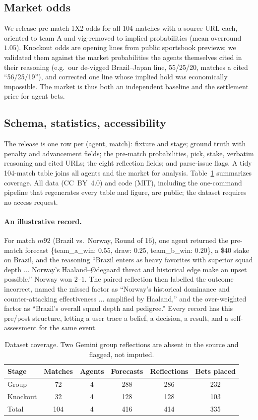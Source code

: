 \documentclass[sigconf,nonacm]{acmart}
\begin{document}
\subsection{Market odds}
\label{sec:odds}
We release pre-match 1X2 odds for all 104 matches with a source URL each,
oriented to team A and vig-removed to implied probabilities (mean overround
$1.05$). Knockout odds are opening lines from public sportsbook previews; we
validated them against the market probabilities the agents themselves cited in
their reasoning (e.g.\ our de-vigged Brazil--Japan line, 55/25/20, matches a
cited ``56/25/19''), and corrected one line whose implied hold was
economically impossible. The market is thus both an independent baseline and the
settlement price for agent bets.

\subsection{Schema, statistics, accessibility}
The release is one row per (agent, match): fixture and stage; ground truth with
penalty and advancement fields; the pre-match probabilities, pick, stake,
verbatim reasoning and cited URLs; the eight reflection fields; and parse-issue
flags. A tidy 104-match table joins all agents and the market for analysis.
Table~\ref{tab:stats} summarizes coverage. All data (CC~BY~4.0) and code (MIT),
including the one-command pipeline that regenerates every table and figure, are
public; the dataset requires no access request.

\paragraph{An illustrative record.} For match $m92$ (Brazil vs.\ Norway,
Round of 16), one agent returned the pre-match forecast \{team\_a\_win: $0.55$,
draw: $0.25$, team\_b\_win: $0.20$\}, a \$40 stake on Brazil, and the reasoning
``Brazil enters as heavy favorites with superior squad depth $\ldots$ Norway's
Haaland--{\O}degaard threat and historical edge make an upset possible.'' Norway
won $2$--$1$. The paired reflection then labelled the outcome
\textsf{incorrect}, named the missed factor as ``Norway's historical dominance
and counter-attacking effectiveness $\ldots$ amplified by Haaland,'' and the
over-weighted factor as ``Brazil's overall squad depth and pedigree.'' Every
record has this pre/post structure, letting a user trace a belief, a decision, a
result, and a self-assessment for the same event.

\begin{table}[t]
\caption{Dataset coverage. Two Gemini group reflections are absent in the source
and flagged, not imputed.}
\label{tab:stats}
\small
\begin{tabular}{lccccc}
\toprule
Stage & Matches & Agents & Forecasts & Reflections & Bets placed \\
\midrule
Group    & 72  & 4 & 288 & 286 & 232 \\
Knockout & 32  & 4 & 128 & 128 & 103 \\
\midrule
Total    & 104 & 4 & 416 & 414 & 335 \\
\bottomrule
\end{tabular}
\end{table}
\end{document}
